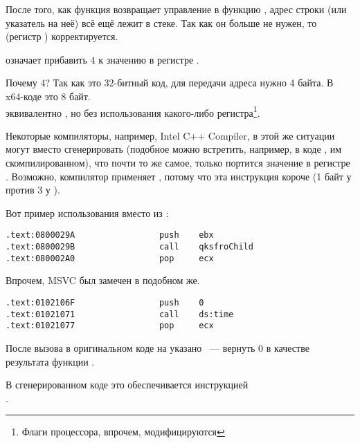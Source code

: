 После того, как функция \printf возвращает управление в функцию \main, адрес строки (или указатель на неё) всё ещё лежит в стеке.
Так как он больше не нужен, то  (регистр \ESP) корректируется.

 означает прибавить 4 к значению в регистре \ESP.

Почему 4? Так как это 32-битный код, для передачи адреса нужно 4 байта. В x64-коде это 8 байт.\\
 эквивалентно , но без использования какого-либо регистра\footnote{Флаги процессора, впрочем, модифицируются}.

\myindex{\oracle}

Некоторые компиляторы, например, Intel C++ Compiler, в этой же ситуации могут вместо 
\ADD сгенерировать  (подобное можно встретить, например, в коде \oracle{}, им скомпилированном),
что почти то же самое, только портится значение в регистре \ECX.
Возможно, компилятор применяет , потому что эта инструкция короче (1 байт у  против 3 у ).

Вот пример использования \POP вместо \ADD из \oracle{}:

\begin{lstlisting}[caption=\oracle 10.2 Linux (файл app.o),style=customasmx86]
.text:0800029A                 push    ebx
.text:0800029B                 call    qksfroChild
.text:080002A0                 pop     ecx
\end{lstlisting}

Впрочем, MSVC был замечен в подобном же.

\begin{lstlisting}[caption=MineSweeper из Windows 7 32-bit]
.text:0102106F                 push    0
.text:01021071                 call    ds:time
.text:01021077                 pop     ecx
\end{lstlisting}

После вызова \printf в оригинальном коде на \CCpp указано ~--- вернуть 0 в качестве результата функции \main.

В сгенерированном коде это обеспечивается инструкцией \\
.


